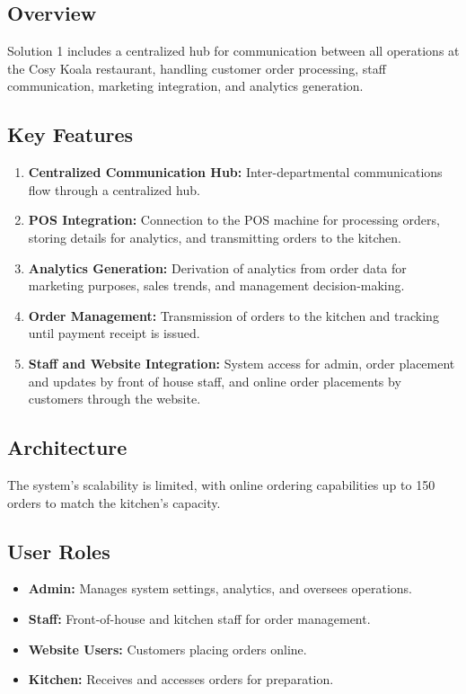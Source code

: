 \documentclass{article}
\begin{document}
\subsection*{Overview}
Solution 1 includes a centralized hub for communication between all operations at the Cosy Koala restaurant, handling customer order processing, staff communication, marketing integration, and analytics generation.

\subsection*{Key Features}
\begin{enumerate}[label=\alph*.]
    \item \textbf{Centralized Communication Hub:} Inter-departmental communications flow through a centralized hub.
    \item \textbf{POS Integration:} Connection to the POS machine for processing orders, storing details for analytics, and transmitting orders to the kitchen.
    \item \textbf{Analytics Generation:} Derivation of analytics from order data for marketing purposes, sales trends, and management decision-making.
    \item \textbf{Order Management:} Transmission of orders to the kitchen and tracking until payment receipt is issued.
    \item \textbf{Staff and Website Integration:} System access for admin, order placement and updates by front of house staff, and online order placements by customers through the website.
\end{enumerate}

\subsection*{Architecture}
The system's scalability is limited, with online ordering capabilities up to 150 orders to match the kitchen's capacity.

\subsection*{User Roles}
\begin{itemize}
    \item \textbf{Admin:} Manages system settings, analytics, and oversees operations.
    \item \textbf{Staff:} Front-of-house and kitchen staff for order management.
    \item \textbf{Website Users:} Customers placing orders online.
    \item \textbf{Kitchen:} Receives and accesses orders for preparation.
\end{itemize}
\end{document}
